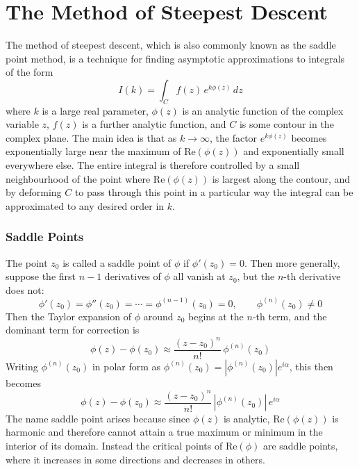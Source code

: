 \chapter{The Method of Steepest Descent}\label{Sec3.4}

The method of steepest descent, which is also commonly known as the saddle point method, is a technique for finding asymptotic approximations to integrals of the form
\begin{equation}\label{Eq:steepest_general}
    I(k) = \int_{C} f(z)\, e^{k\phi(z)}\, dz
\end{equation}
where $k$ is a large real parameter, $\phi(z)$ is an analytic function of the 
complex variable $z$, $f(z)$ is a further analytic function, and $C$ is some 
contour in the complex plane. The main idea is that as $k \to \infty$, the 
factor $e^{k\phi(z)}$ becomes exponentially large near the maximum of 
$\text{Re}(\phi(z))$ and exponentially small everywhere else. The entire integral is therefore controlled by a small neighbourhood of the point where $\text{Re}(\phi(z))$ is largest along the contour, and by deforming $C$ to pass through this point in a particular way the integral can be approximated to any desired order in $k$. \cite{RedBook,Asymptotic,Steepestdescent,Steepestorigin, bleistein1986,miller2006}

\subsection{Saddle Points}

The point $z_0$ is called a saddle point of $\phi$ if $\phi'(z_0) = 0$. Then more generally, suppose the first $n-1$ derivatives of $\phi$ all vanish at $z_0$, but the $n$-th derivative does not:$$\phi'(z_0) = \phi''(z_0) = \cdots = \phi^{(n-1)}(z_0) = 0, \qquad \phi^{(n)}(z_0) \neq 0$$Then the Taylor expansion of $\phi$ around $z_0$ begins at the $n$-th term, and the dominant term for correction is
\begin{equation}\label{Eq:taylor_saddle}    \phi(z) - \phi(z_0) \approx \frac{(z-z_0)^n}{n!}\,\phi^{(n)}(z_0)
\end{equation}
Writing $\phi^{(n)}(z_0)$ in polar form as $\phi^{(n)}(z_0) = |\phi^{(n)}(z_0)|e^{i\alpha}$, this then becomes$$\phi(z) - \phi(z_0) \approx \frac{(z-z_0)^n}{n!}\,|\phi^{(n)}(z_0)|\,e^{i\alpha}$$The name saddle point arises because since $\phi(z)$ is analytic, $\text{Re}(\phi(z))$ is harmonic and therefore cannot attain a true maximum or minimum in the interior of its domain. Instead the critical points of $\text{Re}(\phi)$ are saddle points, where it increases in some directions and 
decreases in others. \cite{RedBook, Asymptotic, Steepestdescent, Steepestorigin} 


